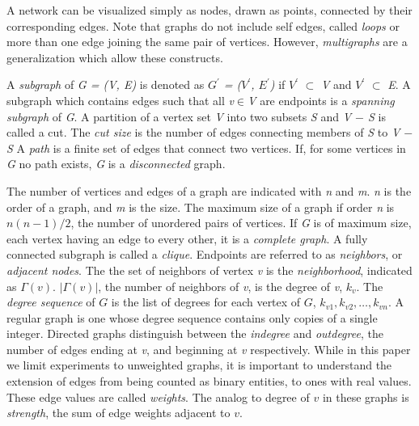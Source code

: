 A network can be visualized simply as nodes, drawn as points, connected by their corresponding edges. Note that graphs do not include self edges, called \textit{loops} or more than one edge joining the same pair of vertices. However, \textit{multigraphs} are a generalization which allow these constructs. 

A \textit{subgraph} of \textit{G = (V, E)} is denoted as \textit{$G^\prime$ = ($V^\prime$, $E^\prime$)} if \textit{$V^\prime$} $\subset$ \textit{V} and \textit{$V^\prime$} $\subset$ \textit{E}. A subgraph which contains edges such that all \textit{v}$\in$\textit{V} are endpoints is a \textit{spanning subgraph} of \textit{G}. 
A partition of a vertex set \textit{V} into two subsets \textit{S} and \textit{V $-$ S} is called a cut. The \textit{cut size} is the number of edges connecting members of \textit{S} to \textit{V $-$ S}
A \textit{path} is a finite set of edges that connect two vertices. If, for some vertices in \textit{G} no path exists, \textit{G} is a \textit{disconnected} graph.

The number of vertices and edges of a graph are indicated with \textit{n} and \textit{m}. \textit{n} is the order of a graph, and \textit{m} is the size. The maximum size of a graph if order \textit{n} is $n(n-1)/2$, the number of unordered pairs of vertices. If \textit{G} is of maximum size, each vertex having an edge to every other, it is a \textit{complete graph}. 
A fully connected subgraph is called a \textit{clique}. Endpoints are referred to as \textit{neighbors}, or \textit{adjacent nodes}. The the set of neighbors of vertex \textit{v} is the \textit{neighborhood}, indicated as \textit{$\Gamma(v)$}. $|\Gamma(v)|$, the number of neighbors of \textit{v}, is the degree of \textit{v}, $k_v$. The \textit{degree sequence} of $G$ is the list of degrees for each vertex of $G$, $k_{v1}, k_{v2},\dots, k_{vn}$. 
A regular graph is one whose degree sequence contains only copies of a single integer. Directed graphs distinguish between the \textit{indegree} and \textit{outdegree}, the number of edges ending at \textit{v}, and beginning at \textit{v} respectively. While in this paper we limit experiments to unweighted graphs, it is important to understand the extension of edges from being counted as binary entities, to ones with real values. These edge values are called \textit{weights}. The analog to degree of $v$ in these graphs is \textit{strength}, the sum of edge weights adjacent to $v$.

